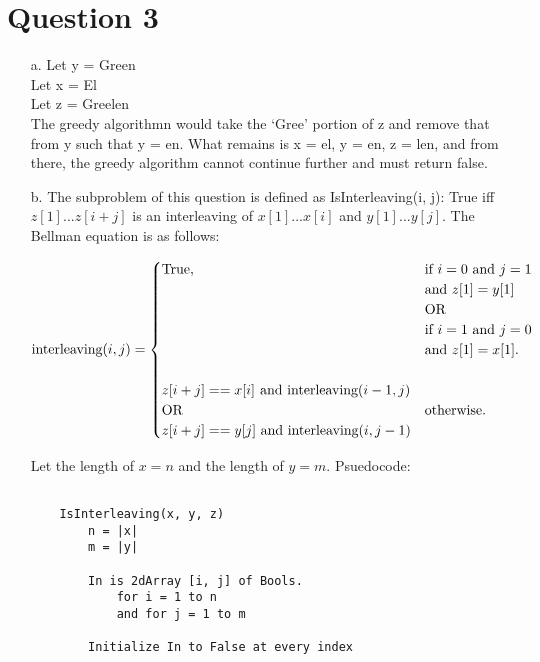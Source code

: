 \documentclass[12pt]{article}
\begin{document}
\section*{Question 3} 
\begin{enumerate}
    \item[a.] Let y = Green\\
              Let x = El\\
              Let z = Greelen\\
 
              The greedy algorithmn would take the `Gree' portion of z and remove that from y such that y = en.
              What remains is x = el, y = en, z = len, and from there, the greedy algorithm cannot continue further
              and must return false.

    \item[b.] The subproblem of this question is defined as IsInterleaving(i, j): True iff $z[1] ... z[i+j]$ is an interleaving of $x[1] ... x[i]$ and $y[1] ... y[j]$. The Bellman equation is as follows:
    
    \begin{equation*}
        \text{interleaving}(i,j)=\begin{cases}
    \text{True}, & \text{if $i = 0$ and $j = 1$} \\ & \text{and $z[1] = y[1]$} \\ & \text{OR} \\ & \text{if $i = 1$ and $j = 0$} \\ & \text{and $z[1] = x[1]$}.\\ \\
    z[i+j] == x[i] \newline \text{ and interleaving}(i-1, j) \\ \text{OR} & \text{otherwise}. \\ z[i+j] == y[j] \text{ and interleaving}(i, j-1)
    \end{cases}
    \end{equation*}
    
    Let the length of $x = n$ and the length of $y = m$. Psuedocode: 
    \begin{verbatim}

    IsInterleaving(x, y, z)
        n = |x|
        m = |y|

        In is 2dArray [i, j] of Bools.
            for i = 1 to n
            and for j = 1 to m
        
        Initialize In to False at every index
        

\end{verbatim}
\end{enumerate}
\end{document}

